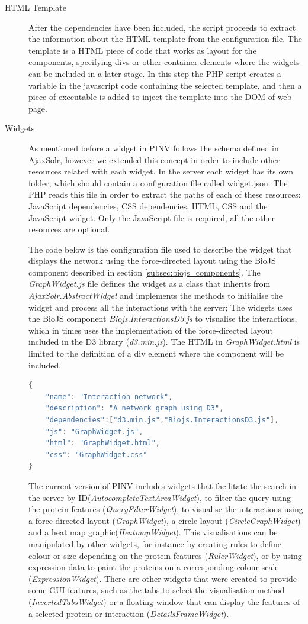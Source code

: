 \begin{description}
\item[HTML Template]
After the dependencies have been included, the script proceeds to extract the information about the HTML template from the configuration file. The template is a HTML piece of code that works as layout for the components, specifying divs or other container elements where the widgets can be included in a later stage. In this step the PHP script creates a variable in the javascript code containing the selected template, and then a piece of executable is added to inject the template into the DOM of web page.

\item[Widgets]
As mentioned before a widget in PINV follows the schema defined in AjaxSolr, however we extended this concept in order to include other resources related with each widget. In the server each widget has its own folder, which should contain a configuration file called widget.json. The PHP reads  this file in order to extract the paths of each of these resources: JavaScript dependencies, CSS dependencies, HTML, CSS and the JavaScript widget. Only the JavaScript file is required, all the other resources are optional. 

The code below is the configuration file used to describe the widget that displays the network using the force-directed layout using the BioJS component described in section \ref{subsec:biojs_components}. The \emph{GraphWidget.js} file defines the widget as a class that inherits from \emph{AjaxSolr.AbstractWidget} and implements the methods to initialise the widget and process all the interactions with the server; The widgets uses the BioJS component \emph{Biojs.InteractionsD3.js} to visualise the interactions, which in times uses the implementation of the force-directed layout included in the D3 library (\emph{d3.min.js}). The HTML in \emph{GraphWidget.html} is limited to the definition of a div element where the component will be included.

\begin{lstlisting}[language=java]
{
    "name": "Interaction network",
    "description": "A network graph using D3",
    "dependencies":["d3.min.js","Biojs.InteractionsD3.js"],
    "js": "GraphWidget.js",
    "html": "GraphWidget.html",
    "css": "GraphWidget.css"
} 
\end{lstlisting}
The current version of PINV includes widgets that facilitate the search in the server by ID(\emph{AutocompleteTextAreaWidget}), to filter the query using the protein features (\emph{QueryFilterWidget}), to visualise the interactions using a force-directed layout (\emph{GraphWidget}), a circle layout (\emph{CircleGraphWidget}) and a heat map graphic(\emph{HeatmapWidget}). This visualisations can be manipulated by other widgets, for instance by creating rules to define colour or size  depending on the protein features (\emph{RulerWidget}), or by using expression data to paint the proteins on a corresponding colour scale (\emph{ExpressionWidget}). There are other widgets that were created to provide some GUI features, such as the tabs to select the visualisation method (\emph{InvertedTabsWidget}) or a floating window that can display the features of a selected protein or interaction (\emph{DetailsFrameWidget}).


\end{description}
